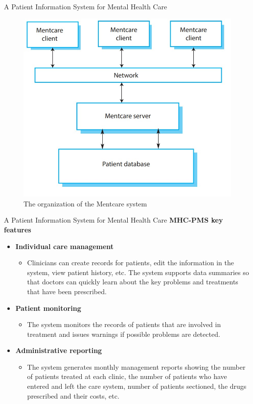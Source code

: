 \documentclass{beamer}
\begin{document}
\begin{frame}{A Patient Information System for Mental Health Care}
	\begin{figure}
		\includegraphics[scale=.45]{img/m1_3.jpg}
		\caption{The 
			organization of the 
			Mentcare system}
	\end{figure}
\end{frame}
\begin{frame}{A Patient Information System for Mental Health Care}
\textbf{MHC-PMS key features}
\begin{itemize}
	\item \textbf{Individual care management} 
	\begin{itemize}
		\item Clinicians can create records for patients, edit the information in the system, view patient history, etc. The system supports data summaries so that doctors can quickly learn about the key problems and treatments that have been prescribed.
	\end{itemize}
	
	\item \textbf{Patient monitoring}
	\begin{itemize}
		\item The system monitors the records of patients that are involved in treatment and issues warnings if possible problems are detected. 
	\end{itemize} 

\item	\textbf{Administrative reporting}
	\begin{itemize}
		\item The system generates monthly management reports showing the number of patients treated at each clinic, the number of patients who have entered and left the care system, number of patients sectioned, the drugs prescribed and their costs, etc. 
	\end{itemize} 
\end{itemize}
\end{frame}
\end{document}
